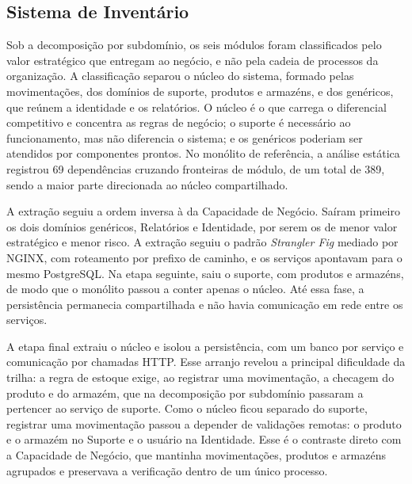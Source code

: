 \subsection*{Sistema de Inventário}

Sob a decomposição por subdomínio, os seis módulos foram classificados pelo valor estratégico que entregam ao negócio, e não pela cadeia de processos da organização. A classificação separou o núcleo do sistema, formado pelas movimentações, dos domínios de suporte, produtos e armazéns, e dos genéricos, que reúnem a identidade e os relatórios. O núcleo é o que carrega o diferencial competitivo e concentra as regras de negócio; o suporte é necessário ao funcionamento, mas não diferencia o sistema; e os genéricos poderiam ser atendidos por componentes prontos. No monólito de referência, a análise estática registrou 69 dependências cruzando fronteiras de módulo, de um total de 389, sendo a maior parte direcionada ao núcleo compartilhado.

A extração seguiu a ordem inversa à da Capacidade de Negócio. Saíram primeiro os dois domínios genéricos, Relatórios e Identidade, por serem os de menor valor estratégico e menor risco. A extração seguiu o padrão \textit{Strangler Fig} mediado por NGINX, com roteamento por prefixo de caminho, e os serviços apontavam para o mesmo PostgreSQL. Na etapa seguinte, saiu o suporte, com produtos e armazéns, de modo que o monólito passou a conter apenas o núcleo. Até essa fase, a persistência permanecia compartilhada e não havia comunicação em rede entre os serviços.

A etapa final extraiu o núcleo e isolou a persistência, com um banco por serviço e comunicação por chamadas HTTP. Esse arranjo revelou a principal dificuldade da trilha: a regra de estoque exige, ao registrar uma movimentação, a checagem do produto e do armazém, que na decomposição por subdomínio passaram a pertencer ao serviço de suporte. Como o núcleo ficou separado do suporte, registrar uma movimentação passou a depender de validações remotas: o produto e o armazém no Suporte e o usuário na Identidade. Esse é o contraste direto com a Capacidade de Negócio, que mantinha movimentações, produtos e armazéns agrupados e preservava a verificação dentro de um único processo.

